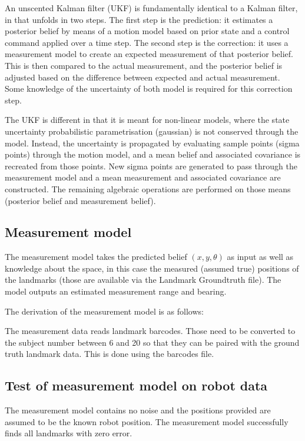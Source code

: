 \documentclass{article}
\begin{document}
An unscented Kalman filter (UKF) is fundamentally identical to a Kalman filter, in that unfolds in two steps. The first step is the prediction: it estimates a posterior belief by means of a motion model based on prior state and a control command applied over a time step. The second step is the correction: it uses a measurement model to create an expected measurement of that posterior belief. This is then compared to the actual measurement, and the posterior belief is adjusted based on the difference between expected and actual measurement. Some knowledge of the uncertainty of both model is required for this correction step.

The UKF is different in that it is meant for non-linear models, where the state uncertainty probabilistic parametrisation (gaussian) is not conserved through the model. Instead, the uncertainty is propagated by evaluating sample points (sigma points) through the motion model, and a mean belief and associated covariance is recreated from those points. New sigma points are generated to pass through the measurement model and a mean measurement and associated covariance are constructed. 
The remaining algebraic operations are performed on those means (posterior belief and measurement belief).


\subsection{Measurement model}

The measurement model takes the predicted belief $(x, y, \theta)$ as input as well as knowledge about the space, in this case the measured (assumed true) positions of the landmarks (those are available via the Landmark Groundtruth file).
The model outputs an estimated measurement range and bearing.

The derivation of the measurement model is as follows:

The measurement data reads landmark barcodes. Those need to be converted to the subject number between 6 and 20 so that they can be paired with the ground truth landmark data. This is done using the barcodes file.


\subsection{Test of measurement model on robot data}
The measurement model contains no noise and the positions provided are assumed to be the known robot position. The measurement model successfully finds all landmarks with zero error.
\end{document}
